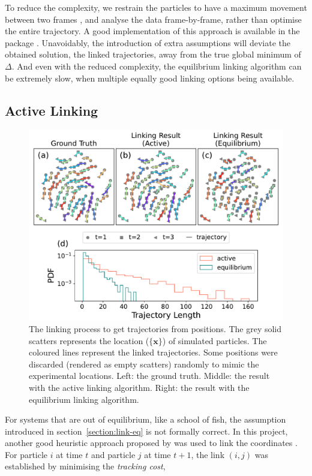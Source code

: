 \documentclass[11pt,twoside]{report}
\begin{document}
To reduce the complexity, we restrain the particles to have a maximum movement between two frames \cite{crocker1996}, and analyse the data frame-by-frame, rather than optimise the entire trajectory. A good implementation of this approach is available in the  package \cite{allan2021}. Unavoidably, the introduction of extra assumptions will deviate the obtained solution, the linked trajectories, away from the true global minimum of $\Delta$. And even with the reduced complexity, the equilibrium linking algorithm can be extremely slow, when multiple equally good linking options being available.

\subsection{Active Linking}
\label{section:link-act}

\begin{figure}
  \includegraphics[width=\linewidth]{linking-sim}
  \caption[Comparing two linking algorithms]{
  The linking process to get trajectories from positions. The grey solid scatters represents the location ($\{\mathbf{x}\}$) of simulated particles. The coloured lines represent the linked trajectories. Some positions were discarded (rendered as empty scatters) randomly to mimic the experimental locations.
  Left: the ground truth.
  Middle: the result with the active linking algorithm.
  Right: the result with the equilibrium linking algorithm.
  }
  \label{fig:link-sim}
\end{figure}

For systems that are out of equilibrium, like a school of fish, the assumption introduced in section~\ref{section:link-eq} is not formally correct. In this project, another good heuristic approach proposed by \citeauthor{ouellette2005ef} was used to link the coordinates \cite{ouellette2005ef}.
For particle $i$ at time $t$ and particle $j$ at time $t+1$, the link $(i, j)$ was established by minimising the \emph{tracking cost},
\end{document}
